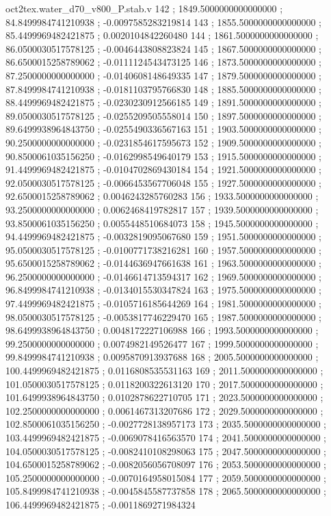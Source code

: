 \begin{filecontents}[overwrite]{oct2tex.water_d70_v800_P.stab.v}
142 ; 1849.5000000000000000 ; 84.8499984741210938 ; -0.0097585283219814
143 ; 1855.5000000000000000 ; 85.4499969482421875 ; 0.0020104842260480
144 ; 1861.5000000000000000 ; 86.0500030517578125 ; -0.0046443808823824
145 ; 1867.5000000000000000 ; 86.6500015258789062 ; -0.0111124543473125
146 ; 1873.5000000000000000 ; 87.2500000000000000 ; -0.0140608148649335
147 ; 1879.5000000000000000 ; 87.8499984741210938 ; -0.0181103795766830
148 ; 1885.5000000000000000 ; 88.4499969482421875 ; -0.0230230912566185
149 ; 1891.5000000000000000 ; 89.0500030517578125 ; -0.0255209505558014
150 ; 1897.5000000000000000 ; 89.6499938964843750 ; -0.0255490336567163
151 ; 1903.5000000000000000 ; 90.2500000000000000 ; -0.0231854617595673
152 ; 1909.5000000000000000 ; 90.8500061035156250 ; -0.0162998549640179
153 ; 1915.5000000000000000 ; 91.4499969482421875 ; -0.0104702869430184
154 ; 1921.5000000000000000 ; 92.0500030517578125 ; -0.0066453567706048
155 ; 1927.5000000000000000 ; 92.6500015258789062 ; 0.0046243285760283
156 ; 1933.5000000000000000 ; 93.2500000000000000 ; 0.0062468419782817
157 ; 1939.5000000000000000 ; 93.8500061035156250 ; 0.0055448510684073
158 ; 1945.5000000000000000 ; 94.4499969482421875 ; -0.0032819095067680
159 ; 1951.5000000000000000 ; 95.0500030517578125 ; -0.0100771738216281
160 ; 1957.5000000000000000 ; 95.6500015258789062 ; -0.0144636947661638
161 ; 1963.5000000000000000 ; 96.2500000000000000 ; -0.0146614713594317
162 ; 1969.5000000000000000 ; 96.8499984741210938 ; -0.0134015530347824
163 ; 1975.5000000000000000 ; 97.4499969482421875 ; -0.0105716185644269
164 ; 1981.5000000000000000 ; 98.0500030517578125 ; -0.0053817746229470
165 ; 1987.5000000000000000 ; 98.6499938964843750 ; 0.0048172227106988
166 ; 1993.5000000000000000 ; 99.2500000000000000 ; 0.0074982149526477
167 ; 1999.5000000000000000 ; 99.8499984741210938 ; 0.0095870913937688
168 ; 2005.5000000000000000 ; 100.4499969482421875 ; 0.0116808535531163
169 ; 2011.5000000000000000 ; 101.0500030517578125 ; 0.0118200322613120
170 ; 2017.5000000000000000 ; 101.6499938964843750 ; 0.0102878622710705
171 ; 2023.5000000000000000 ; 102.2500000000000000 ; 0.0061467313207686
172 ; 2029.5000000000000000 ; 102.8500061035156250 ; -0.0027728138957173
173 ; 2035.5000000000000000 ; 103.4499969482421875 ; -0.0069078416563570
174 ; 2041.5000000000000000 ; 104.0500030517578125 ; -0.0082410108298063
175 ; 2047.5000000000000000 ; 104.6500015258789062 ; -0.0082056056708097
176 ; 2053.5000000000000000 ; 105.2500000000000000 ; -0.0070164958015084
177 ; 2059.5000000000000000 ; 105.8499984741210938 ; -0.0045845587737858
178 ; 2065.5000000000000000 ; 106.4499969482421875 ; -0.0011869271984324

\end{filecontents}
